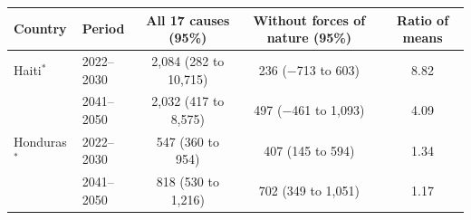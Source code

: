 \begin{tabular}{llccc}
\toprule
Country & Period & All 17 causes (95\%) & Without forces of nature (95\%) & Ratio of means \\
\midrule
Haiti$^{*}$ & 2022--2030 & 2,084 (282 to 10,715) & 236 ($-$713 to 603) & 8.82 \\
 & 2041--2050 & 2,032 (417 to 8,575) & 497 ($-$461 to 1,093) & 4.09 \\
Honduras$^{*}$ & 2022--2030 & 547 (360 to 954) & 407 (145 to 594) & 1.34 \\
 & 2041--2050 & 818 (530 to 1,216) & 702 (349 to 1,051) & 1.17 \\
\bottomrule
\end{tabular}
